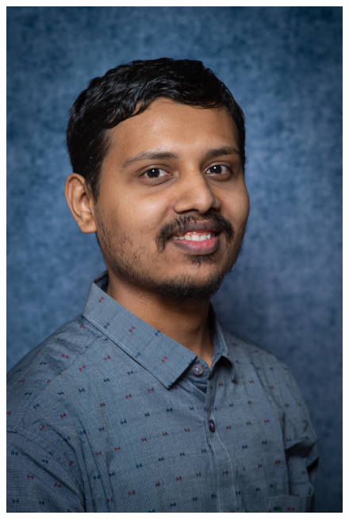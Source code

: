 \documentclass[letterpaper, 10pt]{article}
\begin{document}
    \begin{figure}
        \centering
        \includegraphics[width=1\linewidth]{images/abhishek_r_s.jpg}
    \end{figure}
    \paragraph{}
\end{document}
